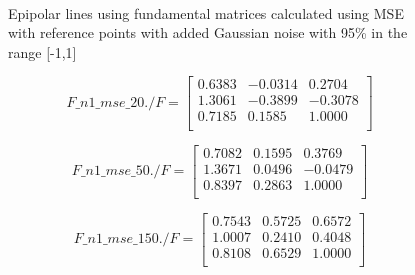 \documentclass[peerreview,11pt]{IEEEtran}
\begin{document}
\begin{figure}[ht]
	~
	\\
		
		
	\caption{Epipolar lines using fundamental matrices calculated using MSE with reference points with added Gaussian noise with 95\% in the range [-1,1]}
	\label{fig:mse_n1}
\end{figure}



\[
F\_n1\_mse\_20./F = 
\begin{bmatrix}
    0.6383  & -0.0314  &  0.2704\\
    1.3061  & -0.3899  & -0.3078\\
    0.7185  &  0.1585  &  1.0000\\
\end{bmatrix}
\]


\[
F\_n1\_mse\_50./F = 
\begin{bmatrix}
    0.7082  &  0.1595  &  0.3769\\
    1.3671  &  0.0496  & -0.0479\\
    0.8397  &  0.2863  &  1.0000\\
\end{bmatrix}
\]


\[
F\_n1\_mse\_150./F = 
\begin{bmatrix}
    0.7543  &  0.5725  &  0.6572\\
    1.0007  &  0.2410  &  0.4048\\
    0.8108  &  0.6529  &  1.0000\\
\end{bmatrix}
\]
\end{document}
